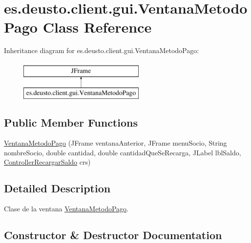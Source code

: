 \hypertarget{classes_1_1deusto_1_1client_1_1gui_1_1_ventana_metodo_pago}{}\section{es.\+deusto.\+client.\+gui.\+Ventana\+Metodo\+Pago Class Reference}
\label{classes_1_1deusto_1_1client_1_1gui_1_1_ventana_metodo_pago}
Inheritance diagram for es.\+deusto.\+client.\+gui.\+Ventana\+Metodo\+Pago\+:\begin{figure}[H]
\begin{center}
\leavevmode
\includegraphics[height=2.000000cm]{classes_1_1deusto_1_1client_1_1gui_1_1_ventana_metodo_pago}
\end{center}
\end{figure}
\subsection*{Public Member Functions}
\begin{DoxyCompactItemize}
\item 
\mbox{\hyperlink{classes_1_1deusto_1_1client_1_1gui_1_1_ventana_metodo_pago_ad9adbfb51719d71b59e3b8ec88d43175}{Ventana\+Metodo\+Pago}} (J\+Frame ventana\+Anterior, J\+Frame menu\+Socio, String nombre\+Socio, double cantidad, double cantidad\+Que\+Se\+Recarga, J\+Label lbl\+Saldo, \mbox{\hyperlink{classes_1_1deusto_1_1client_1_1controllers_1_1_controller_recargar_saldo}{Controller\+Recargar\+Saldo}} crs)
\end{DoxyCompactItemize}


\subsection{Detailed Description}
Clase de la ventana \mbox{\hyperlink{classes_1_1deusto_1_1client_1_1gui_1_1_ventana_metodo_pago}{Ventana\+Metodo\+Pago}}. 

\subsection{Constructor \& Destructor Documentation}
\mbox{\label{classes_1_1deusto_1_1client_1_1gui_1_1_ventana_metodo_pago_ad9adbfb51719d71b59e3b8ec88d43175}} 
